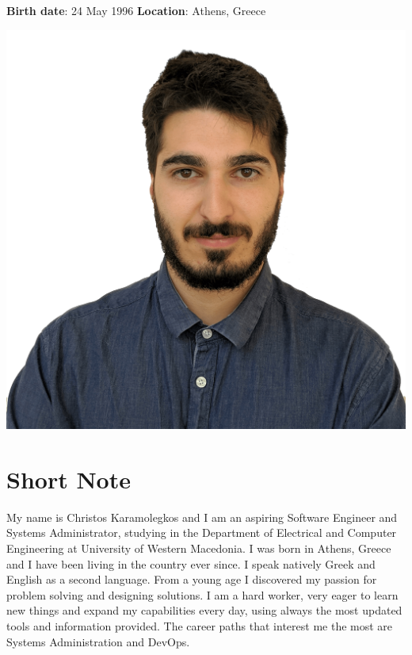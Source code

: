 \documentclass{mycv}
\begin{document}
	\pagestyle{empty}
	\begin{minipage}{.7\textwidth}
		\begin{flushleft}
			\centering
			{\bf Birth date}: 24 May 1996 {\Large\textperiodcentered} {\bf Location}: Athens, Greece
		\end{flushleft}
	\end{minipage}
	\begin{minipage}{.3\textwidth}
		\begin{flushright}
			\includegraphics[scale=0.05]{assets/christos.png}
		\end{flushright}
	\end{minipage}
	\vspace*{-0.5cm}
	\section{Short Note}
	\textnormal My name is Christos Karamolegkos and I am an aspiring Software Engineer and Systems Administrator, studying in the Department of Electrical and Computer Engineering at University of Western Macedonia. I was born in Athens, Greece and I have been living in the country ever since. I speak natively Greek and English as a second language. From a young age I discovered my passion for problem solving and designing solutions. I am a hard worker, very eager to learn new things and expand my capabilities every day, using always the most updated tools and information provided. The career paths that interest me the most are Systems Administration and DevOps.
	
\end{document}
